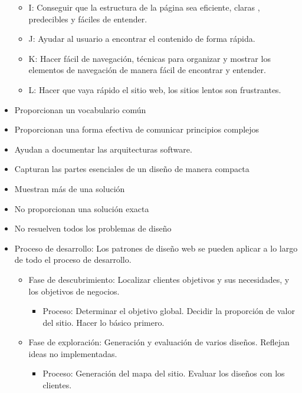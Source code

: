 \documentclass[12pt, twoside, openright]{report} %
\begin{document}
\begin{itemize}
\begin{itemize}
		      \item I: Conseguir que la estructura de la página sea eficiente,
		            claras , predecibles y fáciles de entender.

		      \item J: Ayudar al usuario a encontrar el contenido de forma rápida.

		      \item K: Hacer fácil de navegación, técnicas para organizar y
		            mostrar los elementos de navegación de manera fácil de
		            encontrar y entender.

		      \item L: Hacer que vaya rápido el sitio web, los sitios lentos son
		            frustrantes.

	      \end{itemize}
	\item Proporcionan un vocabulario común
	\item Proporcionan una forma efectiva de comunicar principios
	      complejos
	\item Ayudan a documentar las arquitecturas software.
	\item Capturan las partes esenciales de un diseño de manera compacta
	\item Muestran más de una solución
	\item No proporcionan una solución exacta
	\item No resuelven todos los problemas de diseño
	\pagebreak
	\item Proceso de desarrollo: Los patrones de diseño web se pueden aplicar
	      a lo largo de todo el proceso de desarrollo.
	      \begin{itemize}
		      \item Fase de descubrimiento: Localizar clientes objetivos y sus necesidades, y los objetivos de negocios.
		            \begin{itemize}
			            \item Proceso: Determinar el objetivo global. Decidir la proporción de valor del sitio. Hacer lo básico primero.\end{itemize}
		      \item Fase de exploración: Generación y evaluación de varios diseños. Reflejan ideas no implementadas.
		            \begin{itemize}
			            \item Proceso: Generación del mapa del sitio. Evaluar los diseños con los clientes.\end{itemize}

\end{itemize}
\end{itemize}
\end{document}
